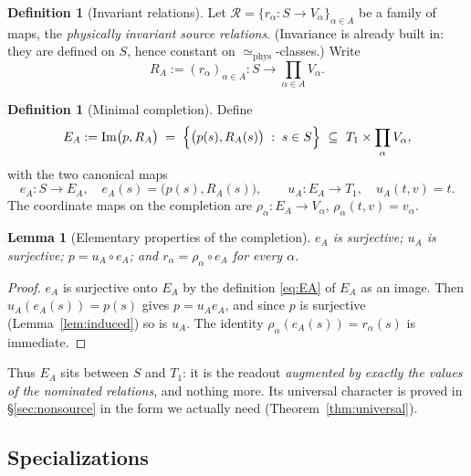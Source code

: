 \documentclass[11pt,reqno]{amsart}
\theoremstyle{plain}
\newtheorem{lemma}[theorem]{Lemma}
\theoremstyle{definition}
\newtheorem{definition}[theorem]{Definition}
\theoremstyle{remark}
\DeclareMathOperator{\Ima}{Im}
\begin{document}
\begin{definition}[Invariant relations]\label{def:relations}
Let $\mathcal R=\{r_\alpha\colon S\to V_\alpha\}_{\alpha\in A}$ be a family of maps, the \emph{physically invariant source relations}. (Invariance is already built in: they are defined on $S$, hence constant on $\simeq_{\mathrm{phys}}$-classes.) Write
\[
R_A:=(r_\alpha)_{\alpha\in A}\colon S\longrightarrow \prod_{\alpha\in A}V_\alpha .
\]
\end{definition}

\begin{definition}[Minimal completion]\label{def:completion}
Define
\begin{equation}\label{eq:EA}
E_A:=\Ima\bigl(p,R_A\bigr)\;=\;\Bigl\{\bigl(p(s),R_A(s)\bigr)\;:\;s\in S\Bigr\}\ \subseteq\ T_1\times\prod_{\alpha}V_\alpha,
\end{equation}
with the two canonical maps
\begin{equation}\label{eq:eAuA}
e_A\colon S\to E_A,\quad e_A(s)=\bigl(p(s),R_A(s)\bigr),
\qquad
u_A\colon E_A\to T_1,\quad u_A(t,v)=t .
\end{equation}
The coordinate maps on the completion are $\rho_\alpha\colon E_A\to V_\alpha$, $\rho_\alpha(t,v)=v_\alpha$.
\end{definition}

\begin{lemma}[Elementary properties of the completion]\label{lem:completionbasic}
$e_A$ is surjective; $u_A$ is surjective; $p=u_A\circ e_A$; and $r_\alpha=\rho_\alpha\circ e_A$ for every $\alpha$.
\end{lemma}

\begin{proof}
$e_A$ is surjective onto $E_A$ by the definition \eqref{eq:EA} of $E_A$ as an image. Then $u_A(e_A(s))=p(s)$ gives $p=u_A e_A$, and since $p$ is surjective (Lemma~\ref{lem:induced}) so is $u_A$. The identity $\rho_\alpha(e_A(s))=r_\alpha(s)$ is immediate.
\end{proof}

Thus $E_A$ sits between $S$ and $T_1$: it is the readout \emph{augmented by exactly the values of the nominated relations}, and nothing more. Its universal character is proved in \S\ref{sec:nonsource} in the form we actually need (Theorem~\ref{thm:universal}).

\subsection{Specializations}
\end{document}
